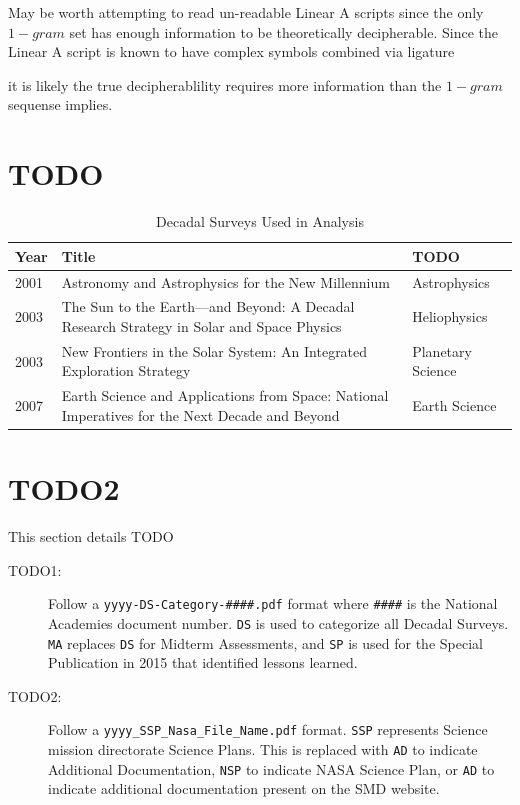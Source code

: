 \documentclass[preprint,12pt]{elsarticle}
\begin{document}
May be worth attempting to read un-readable Linear A scripts since the only \(1-gram\) set has enough information to be theoretically decipherable. Since the Linear A script is known to have complex symbols combined via ligature \cite{} 

it is likely the true decipherablility requires more information than the \(1-gram\) sequense implies. 
\newpage 
\appendix
\section{TODO}
\label{TODO}

\begin{table}[H]
\centering
\begin{tabular}{p{1.2cm} p{7.5cm} p{3.5cm}}
 \hline
 \rowcolor[gray]{0.95}
 \textbf{Year} & \textbf{Title} & \textbf{TODO} \\ \hline
 2001 & Astronomy and Astrophysics for the New Millennium & Astrophysics \\
 \rowcolor[gray]{0.97}
 2003 & The Sun to the Earth—and Beyond: A Decadal Research Strategy in Solar and Space Physics & Heliophysics \\
 2003 & New Frontiers in the Solar System: An Integrated Exploration Strategy & Planetary  Science \\
 \rowcolor[gray]{0.97}
 2007 & Earth Science and Applications from Space: National Imperatives for the Next Decade and Beyond & Earth Science \\
\end{tabular}
\caption{Decadal Surveys Used in Analysis }\label{tab:Decadals_used}
\end{table}

\section{TODO2}
\label{TODO2}
This section details TODO

\begin{description}
 \item[TODO1:] Follow a \texttt{yyyy-DS-Category-\#\#\#\#.pdf} format where \texttt{\#\#\#\#} is the National Academies document number. \texttt{DS} is used to categorize all Decadal Surveys. \texttt{MA} replaces \texttt{DS} for Midterm Assessments, and \texttt{SP} is used for the Special Publication in 2015 that identified lessons learned.
 
 \item[TODO2:] Follow a \texttt{yyyy\_SSP\_Nasa\_File\_Name.pdf} format. \texttt{SSP} represents Science mission directorate Science Plans. This is replaced with \texttt{AD} to indicate Additional Documentation, \texttt{NSP} to indicate NASA Science Plan, or \texttt{AD} to indicate additional documentation present on the SMD website.
\end{description} 


 

\end{document}

